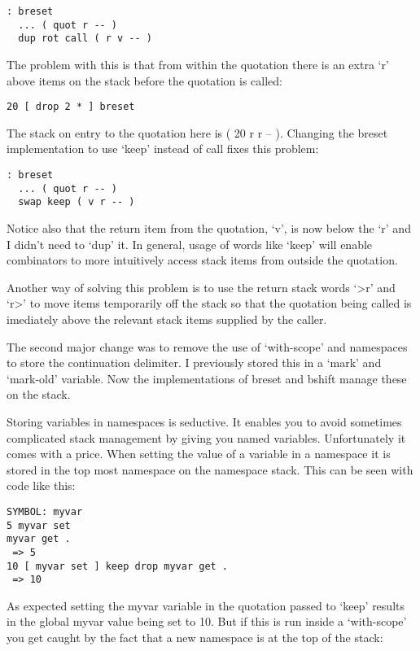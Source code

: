 \begin{verbatim}
: breset 
  ... ( quot r -- )
  dup rot call ( r v -- )
\end{verbatim}


The problem with this is that from within the quotation there is an
 extra `r' above items on the stack before the quotation is called:

\begin{verbatim}
20 [ drop 2 * ] breset
\end{verbatim}


The stack on entry to the quotation here is ( 20 r r -- ). Changing
the breset implementation to use `keep' instead of call fixes this
problem:


\begin{verbatim}
: breset 
  ... ( quot r -- )
  swap keep ( v r -- )
\end{verbatim}


Notice also that the return item from the quotation, `v', is now below
the `r' and I didn't need to `dup' it. In general, usage of words like
`keep' will enable combinators to more intuitively access stack items
from outside the quotation.

Another way of solving this problem is to use the return stack words
`>r' and `r>' to move items temporarily off the stack so that the
quotation being called is imediately above the relevant stack items
supplied by the caller.

The second major change was to remove the use of `with-scope' and
namespaces to store the continuation delimiter. I previously stored
this in a `mark' and `mark-old' variable. Now the implementations of
breset and bshift manage these on the stack.

Storing variables in namespaces is seductive. It enables you to avoid
sometimes complicated stack management by giving you named
variables. Unfortunately it comes with a price. When setting the value
of a variable in a namespace it is stored in the top most namespace on
the namespace stack. This can be seen with code like this:


\begin{verbatim}
SYMBOL: myvar
5 myvar set
myvar get .
 => 5
10 [ myvar set ] keep drop myvar get .
 => 10
\end{verbatim}


As expected setting the myvar variable in the quotation passed to
 `keep' results in the global myvar value being set to 10. But if this
 is run inside a `with-scope' you get caught by the fact that a new
 namespace is at the top of the stack:


